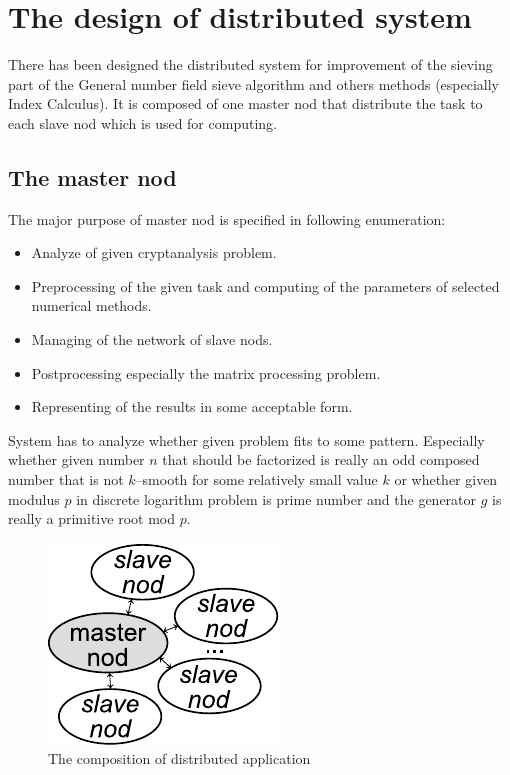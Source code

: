 \documentclass[conference]{IEEEtran}
\begin{document}

\section{The design of distributed system}
There has been designed the distributed system for improvement of the sieving part of the General number field sieve algorithm and others methods (especially Index Calculus). It is composed of one master nod that distribute the task to each slave nod which is used for computing. 

\subsection{The master nod}
The major purpose of master nod is specified in following enumeration:
\begin{itemize}
\item Analyze of given cryptanalysis problem.
\item Preprocessing of the given task and computing of the parameters of selected numerical methods.
\item Managing of the network of slave nods.
\item Postprocessing especially the matrix processing problem.
\item Representing of the results in some acceptable form.
\end{itemize}

System has to analyze whether given problem fits to some pattern. Especially whether given number $n$ that should be factorized is really an odd composed number that is not $k$--smooth for some relatively small value $k$ or whether given modulus $p$ in discrete logarithm problem is prime number and the generator $g$ is really a primitive root mod $p$.

\begin{figure}[htbp]
\centerline{\includegraphics{masterslave.pdf}}
\caption{\label{fig:masterslave}The composition of distributed application}
\end{figure}
\end{document}
